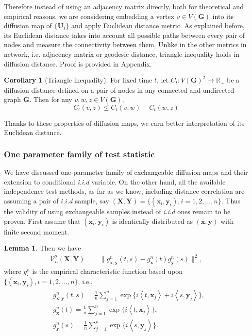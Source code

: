 \documentclass[12pt]{article}
\theoremstyle{definition}
\newtheorem{corollary}{Corollary}[theorem]
\newtheorem{lemma}[theorem]{Lemma}
\begin{document}
Therefore instead of using an adjacency matrix directly, both for theoretical and empirical reasons, we are considering embedding a vertex $v \in V(\mathbf{G})$ into its diffusion map of $\{\mathbf{U}_{t}\}$ and apply Euclidean distance metric. As explained before, its Euclidean distance takes into account all possible paths between every pair of nodes and measure the connectivity between them. Unlike in the other metrics in network, i.e. adjacency matrix or geodesic distance, triangle inequality holds in diffusion distance. Proof is provided in Appendix.
\begin{corollary}[Triangle inequality]
	\label{corollary1}
		For fixed time $t$, let $C_{t} : V(\mathbf{G})^2 \rightarrow \mathbb{R}_{+}$ be a diffusion distance defined on a pair of nodes in any connected and undirected graph $\mathbf{G}$. Then for any $v, w, z \in V(\mathbf{G})$,  
		\begin{equation}
		C_{t}(v,z) \leq C_{t}(v,w) + C_{t}(w,z)
\end{equation}
\end{corollary}		
Thanks to these properties of diffusion maps, we earn better interpretation of its Euclidean distance.

\subsubsection{One parameter family of test statistic}

We have discussed one-parameter family of exchangeable diffusion maps and their extension to conditional \textit{i.i.d} variable. On the other hand, all the available independence test methods, as far as we know, including distance correlation are assuming a pair of $\textit{i.i.d}$ sample, say $(\mathbf{X}, \mathbf{Y} )  = \{(\mathbf{x}_{i},\mathbf{y}_{i}), i=1,2,...,n\}$. Thus the validity of using exchangeable samples instead of \textit{i.i.d} ones remain to be proven. First assume that $( \mathbf{x}_{i}, \mathbf{y}_{i} )$ is identically distributed as $(\mathbf{x}, \mathbf{y})$ with finite second moment. 

\begin{lemma}
	\label{lemma1}
   Then we have 
	\begin{eqnarray*}
		\mathcal{V}^{2}_{n}(\mathbf{X},\mathbf{Y}) &= \|g_{\mathbf{x},\mathbf{y}}^{n}(t,s)-g_{\mathbf{x}}^{n}(t)g_{\mathbf{y}}^{n}(s)\|^{2},
	\end{eqnarray*}
	where $g_{\cdot}^{n}$ is the empirical characteristic function based upon $\{(\mathbf{x}_{i},\mathbf{y}_{i}), i=1,2,...,n\}$, i.e., 
	\begin{eqnarray*}
		&g_{\mathbf{x},\mathbf{y}}^{n}(t,s) = \frac{1}{n}\sum_{j=1}^{n}\exp\{i \left\langle t,\mathbf{x}_{j} \right\rangle  +i \left\langle  s,\mathbf{y}_{j}\right\rangle \}, \\
		&g_{\mathbf{x}}^{n}(t) = \frac{1}{n}\sum_{j=1}^{n}\exp\{i \left\langle t,\mathbf{x}_{j}\right\rangle\}, \\
		&g_{\mathbf{y}}^{n}(s) = \frac{1}{n}\sum_{j=1}^{n}\exp\{i \left\langle s,\mathbf{y}_{j}\right\rangle\}.
	\end{eqnarray*}
\end{lemma}
\end{document}
